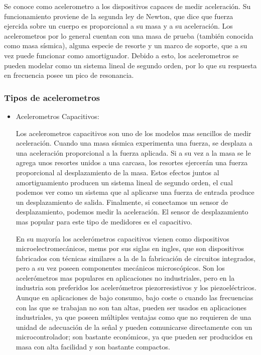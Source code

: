 Se conoce como acelerometro a los dispositivos capaces de medir aceleración. Su
funcionamiento proviene de la segunda ley de Newton, que dice que fuerza
ejercida sobre un cuerpo es proporcional a su masa y a su aceleración. Los
acelerometros por lo general cuentan con una masa de prueba (también conocida
como masa sísmica), alguna especie de resorte y un marco de soporte, que a su
vez puede funcionar como amortiguador. Debido a esto, los acelerometros se
pueden modelar como un sistema lineal de segundo orden, por lo que su respuesta
en frecuencia posee un pico de resonancia.

\subsubsection*{Tipos de acelerometros}

\begin{itemize}
    \item  Acelerometros Capacitivos:

Los acelerometros capacitivos son uno de los modelos mas sencillos de medir
aceleración. Cuando una masa sísmica experimenta una fuerza, se desplaza a una
aceleración proporcional a la fuerza aplicada. Si a su vez a la masa se le
agrega unos resortes unidos a una carcasa, los resortes ejercerán una fuerza
proporcional al desplazamiento de la masa. Estos efectos juntos al
amortiguamiento producen un sistema lineal de segundo orden, el cual podemos
ver como un sistema que al aplicarse una fuerza de entrada produce un
desplazamiento de salida. Finalmente, si conectamos un sensor de
desplazamiento, podemos medir la aceleración. El sensor de desplazamiento mas
popular para este tipo de medidores es el capacitivo.

En su mayoría los acelerómetros capacitivos vienen como dispositivos
microelectromecánicos, mems por sus siglas en ingles, que son dispositivos
fabricados con técnicas similares a la de la fabricación de circuitos
integrados, pero a su vez poseen componentes mecánicos microscópicos. Son los
acelerómetros mas populares en aplicaciones no industriales, pero en la
industria son preferidos los acelerómetros piezorresistivos y los piezoeléctricos.
Aunque en aplicaciones de bajo consumo, bajo coste o cuando las frecuencias con
las que se trabajan no son tan altas, pueden ser usados en aplicaciones
industriales, ya que poseen múltiples ventajas como que no requieren de una
unidad de adecuación de la señal y pueden comunicarse directamente con un
microcontrolador; son bastante económicos, ya que pueden ser producidos en
masa con alta facilidad y son bastante compactos.


\end{itemize}

